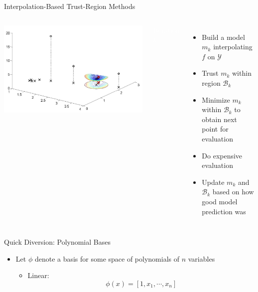 \documentclass[handout,aspectratio=54]{beamer}
\numberwithin{theorem}{section}
\begin{document}
\begin{frame}{Interpolation-Based Trust-Region Methods}
\begin{columns}
\includegraphics[width=\textwidth]{fig/25-4.jpg}

\colorbox[rgb]{0.5,0.6,0.7}{\textcolor{white}{Iteration $k$:}}
\begin{itemize}\small
\item  Build a model $m_k$ interpolating $f$ on $\mathcal{Y}$
\item Trust $m_k$ within region $\mathcal{B}_k$
\item Minimize $m_k$ within $\mathcal{B}_k$ to obtain next point for evaluation
\item Do expensive evaluation
\item Update $m_k$ and $\mathcal{B}_k$ based on how good model prediction was
\end{itemize}
\end{columns}
\end{frame}

\begin{frame}{Quick Diversion: Polynomial Bases}
\begin{itemize}
\item Let $\phi$ denote a basis for some space of polynomials of $n$ variables
	\begin{itemize}
	\item Linear:
\begin{equation*}
\phi(x)=[1,x_1,\cdots,x_n]
\end{equation*}
	\end{itemize}
\end{itemize}
\vspace{5.5cm}
\end{frame}
\end{document}
